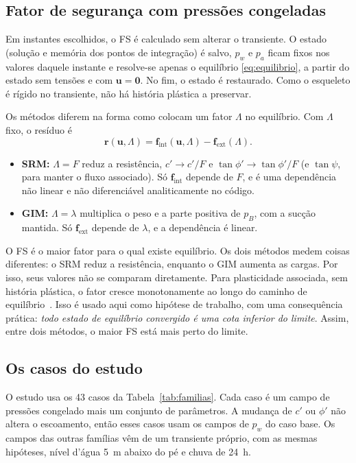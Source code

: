 \documentclass[11pt,a4paper]{article}
\numberwithin{equation}{section}
\begin{document}
\subsection{Fator de segurança com pressões congeladas}\label{sec:fs_congelado}

Em instantes escolhidos, o FS é calculado sem alterar o transiente. O estado (solução e memória dos pontos de integração) é salvo, $p_w$ e
$p_a$ ficam fixos nos valores daquele instante e resolve-se apenas o equilíbrio \eqref{eq:equilibrio}, a partir do estado sem tensões
e com $\mathbf{u} = \mathbf{0}$. No fim, o estado é restaurado. Como o esqueleto é rígido no transiente, não há história plástica a preservar.

Os métodos diferem na forma como colocam um fator $\Lambda$ no equilíbrio. Com $\Lambda$ fixo, o resíduo é
\begin{equation}\label{eq:residuo}
\mathbf{r}(\mathbf{u},\Lambda) = \mathbf{f}_{\mathrm{int}}(\mathbf{u},\Lambda) - \mathbf{f}_{\mathrm{ext}}(\Lambda).
\end{equation}
\begin{itemize}
\item \textbf{SRM:} $\Lambda = F$ reduz a resistência, $c'\to c'/F$ e $\tan\phi'\to\tan\phi'/F$ (e $\tan\psi$, para manter o fluxo associado). Só
$\mathbf{f}_{\mathrm{int}}$ depende de $F$, e é uma dependência não linear e não diferenciável analiticamente no código.
\item \textbf{GIM:} $\Lambda = \lambda$ multiplica o peso e a parte positiva de $p_B$, com a sucção mantida. Só $\mathbf{f}_{\mathrm{ext}}$ depende de
$\lambda$, e a dependência é linear.
\end{itemize}
O FS é o maior fator para o qual existe equilíbrio. Os dois métodos medem coisas diferentes: o SRM reduz a resistência, enquanto o GIM aumenta as
cargas. Por isso, seus valores não se comparam diretamente. Para plasticidade associada, sem história plástica, o fator cresce
monotonamente ao longo do caminho de equilíbrio~\cite{sysala2025}. Isso é usado aqui como hipótese de trabalho, com uma
consequência prática: \emph{todo estado de equilíbrio convergido é uma cota inferior do limite}. Assim, entre dois métodos, o maior FS está
mais perto do limite.

\subsection{Os casos do estudo}\label{sec:casos}

O estudo usa os 43 casos da Tabela~\ref{tab:familias}. Cada caso é um campo de pressões congelado mais um conjunto de parâmetros. A
mudança de $c'$ ou $\phi'$ não altera o escoamento, então esses casos usam os campos de $p_w$ do caso base. Os campos das outras
famílias vêm de um transiente próprio, com as mesmas hipóteses, nível d'água 5~m abaixo do pé e chuva de 24~h.
\end{document}
